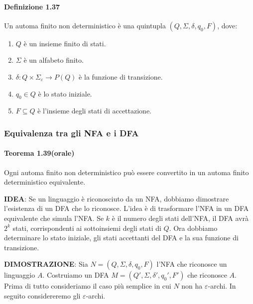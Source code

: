 \documentclass{article}
\begin{document}
\paragraph{Definizione 1.37}
\text{  }
\begin{tcolorbox}[colback=blue!10!white, colframe=blue!50!black, title=Definizione 1.37]
Un automa finito non deterministico è una quintupla $(Q,\Sigma,\delta,q_0,F)$, dove:
\begin{enumerate}
    \item $Q$ è un insieme finito di stati.
    \item $\Sigma$ è un alfabeto finito.
    \item $\delta:Q\times\Sigma_\varepsilon\rightarrow P(Q)$ è la funzione di transizione.
    \item $q_{0}\in Q$ è lo stato iniziale.
    \item $F \subseteq Q$ è l'insieme degli stati di accettazione.
\end{enumerate}
\end{tcolorbox}

\subsubsection{Equivalenza tra gli NFA e i DFA}
\paragraph{Teorema 1.39(orale)}
\label{teorema-1.39}
\text{  }
\begin{tcolorbox}[colback=green!10!white, colframe=green!50!black, title=Teorema 1.39 (orale)]
Ogni automa finito non deterministico può essere convertito in un automa finito deterministico equivalente.
\end{tcolorbox}

\textbf{IDEA}: Se un linguaggio è riconosciuto da un NFA, dobbiamo dimostrare l'esistenza di un DFA che lo riconosce. L'idea è di trasformare l'NFA in un DFA equivalente che simula l'NFA. Se $k$ è il numero degli stati dell'NFA, il DFA avrà $2^k$ stati, corrispondenti ai sottoinsiemi degli stati di $Q$. Ora dobbiamo determinare lo stato iniziale, gli stati accettanti del DFA e la sua funzione di transizione.
\vspace{1em}

\textbf{DIMOSTRAZIONE}:
    Sia $N = (Q, \Sigma, \delta, q_0, F)$ l'NFA che riconosce un linguaggio $A$. Costruiamo un DFA $M = (Q', \Sigma, \delta', q_0', F')$ che riconosce $A$. Prima di tutto consideriamo il caso più semplice in cui $N$ non ha $\varepsilon$-archi. In seguito considereremo gli $\varepsilon$-archi.
    
\end{document}
